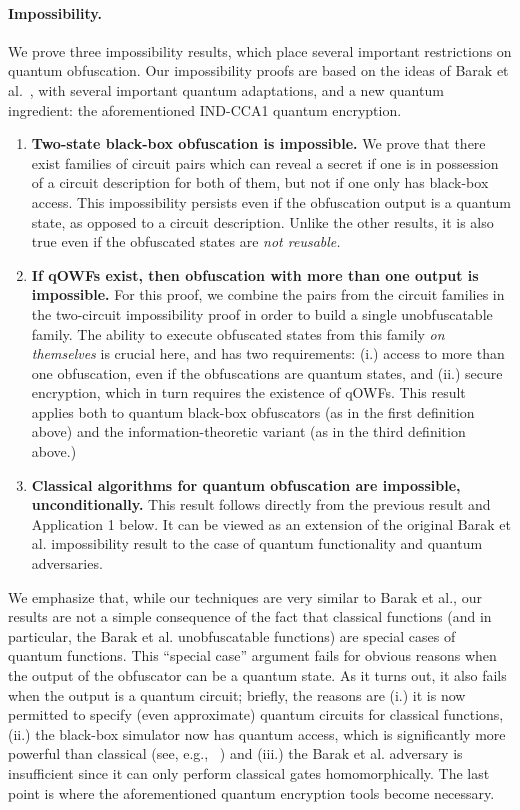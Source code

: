 \documentclass[envcountsame]{llncs}
\numberwithin{equation}{section}
\begin{document}
\paragraph{Impossibility.} We prove three impossibility results, which place several important restrictions on quantum obfuscation. Our impossibility proofs are based on the ideas of Barak et al.~\cite{BGIRSVY12}, with several important quantum adaptations, and a new quantum ingredient: the aforementioned IND-CCA1 quantum encryption.
\begin{enumerate}
\item \textbf{Two-state black-box obfuscation is impossible.} We prove that there exist families of circuit pairs which can reveal a secret if one is in possession of a circuit description for both of them, but not if one only has black-box access. This impossibility persists even if the obfuscation output is a quantum state, as opposed to a circuit description. Unlike the other results, it is also true even if the obfuscated states are \emph{not reusable.}
\item \textbf{If qOWFs exist, then obfuscation with more than one output is impossible.} For this proof, we combine the pairs from the circuit families in the two-circuit impossibility proof in order to build a single unobfuscatable family. The ability to execute obfuscated states from this family \emph{on themselves} is crucial here, and has two requirements: (i.) access to more than one obfuscation, even if the obfuscations are quantum states, and (ii.) secure encryption, which in turn requires the existence of qOWFs. This result applies both to quantum black-box obfuscators (as in the first definition above) and the information-theoretic variant (as in the third definition above.) 
\item \textbf{Classical algorithms for quantum obfuscation are impossible, unconditionally.} This result follows directly from the previous result and Application 1 below. It can be viewed as an extension of the original Barak et al. impossibility result to the case of quantum functionality and quantum adversaries.
\end{enumerate}
We emphasize that, while our techniques are very similar to Barak et al., our results are not a simple consequence of the fact that classical functions (and in particular, the Barak et al. unobfuscatable functions) are special cases of quantum functions. This ``special case'' argument fails for obvious reasons when the output of the obfuscator can be a quantum state. As it turns out, it also fails when the output is a quantum circuit; briefly, the reasons are (i.) it is now permitted to specify (even approximate) quantum circuits for classical functions, (ii.) the black-box simulator now has quantum access, which is significantly more powerful than classical (see, e.g., ~\cite{HR14}) and (iii.) the Barak et al. adversary is insufficient since it can only perform classical gates homomorphically. The last point is where the aforementioned quantum encryption tools become necessary.
\end{document}
